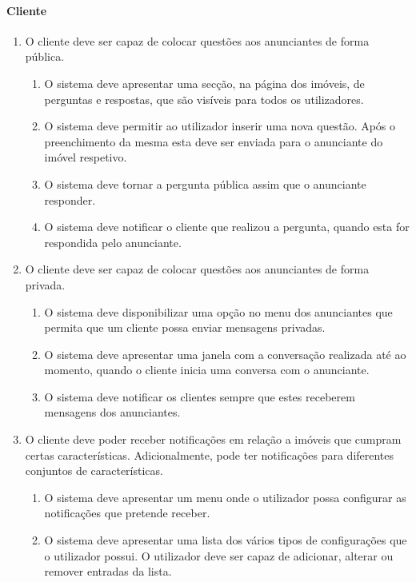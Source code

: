 \paragraph{Cliente}
\begin{enumerate}
    \item O cliente deve ser capaz de colocar questões aos anunciantes de forma
    pública.
    \begin{enumerate}
        \item O sistema deve apresentar uma secção, na página dos imóveis, de perguntas e respostas, que são visíveis para todos os utilizadores.
        \item O sistema deve permitir ao utilizador inserir uma nova questão. Após o preenchimento da mesma esta deve ser enviada para o anunciante do imóvel respetivo.
        \item O sistema deve tornar a pergunta pública assim que o anunciante responder.
        \item O sistema deve notificar o cliente que realizou a pergunta, quando esta for respondida pelo anunciante.
    \end{enumerate}
    \item O cliente deve ser capaz de colocar questões aos anunciantes de forma
    privada.
    \begin{enumerate}
        \item O sistema deve disponibilizar uma opção no menu dos anunciantes que permita que um cliente possa enviar mensagens privadas.
        \item O sistema deve apresentar uma janela com a conversação realizada até ao momento, quando o cliente inicia uma conversa com o anunciante.
        \item O sistema deve notificar os clientes sempre que estes receberem mensagens dos anunciantes.
    \end{enumerate}
    \item O cliente deve poder receber notificações em relação a imóveis que cumpram certas
    características. Adicionalmente, pode ter notificações para diferentes conjuntos de características.
    \begin{enumerate}
        \item O sistema deve apresentar um menu onde o utilizador possa configurar as notificações que pretende receber.
        \item O sistema deve apresentar uma lista dos vários tipos de configurações que o utilizador
        possui. O utilizador deve ser capaz de adicionar, alterar ou remover entradas da lista.

\end{enumerate}
\end{enumerate}
